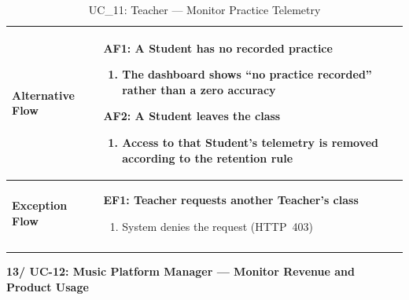 \documentclass[a4paper]{article}
\newlength{\ucLeft}
\begin{document}
\begin{longtable}{|>{\bfseries}p{\ucLeft}|p{\dimexpr\linewidth-\ucLeft-2\tabcolsep-2\arrayrulewidth}|}
\\ \hline
Alternative Flow &
\textbf{AF1: A Student has no recorded practice}
\begin{enumerate}[leftmargin=1.5em, nosep, topsep=2pt, partopsep=0pt, parsep=0pt, after=\strut]
    \item The dashboard shows ``no practice recorded'' rather than a zero accuracy
\end{enumerate}
\textbf{AF2: A Student leaves the class}
\begin{enumerate}[leftmargin=1.5em, nosep, topsep=2pt, partopsep=0pt, parsep=0pt, after=\strut]
    \item Access to that Student's telemetry is removed according to the retention rule
\end{enumerate}
\\ \hline
Exception Flow &
\textbf{EF1: Teacher requests another Teacher's class}
\begin{enumerate}[leftmargin=1.5em, nosep, topsep=2pt, partopsep=0pt, parsep=0pt, after=\strut]
    \item System denies the request (HTTP~403)
\end{enumerate}
\\ \hline
\caption{UC\_11: Teacher --- Monitor Practice Telemetry}\label{tab:uc11_telemetry}
\end{longtable}

\vspace{0.5em}
\noindent\textbf{13/ UC-12: Music Platform Manager --- Monitor Revenue and Product Usage}
\end{document}
